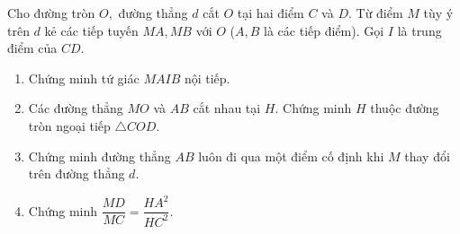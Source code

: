 \begin{bt}%
	Cho đường tròn $O,$ đường thẳng $d$ cắt $O$ tại hai điểm $C$ và $D.$ Từ điểm $M$ tùy ý trên $d$ kẻ các tiếp tuyến $MA,MB$ với $O$ ($A,B$ là các tiếp điểm). Gọi $I$ là trung điểm của $CD.$ 
	\begin{enumerate}
		\item Chứng minh tứ giác $MAIB$ nội tiếp.
		\item Các đường thẳng $MO$ và $AB$ cắt nhau tại $H.$ Chứng minh $H$ thuộc đường tròn ngoại tiếp $ \triangle COD$.
		\item Chứng minh đường thẳng $AB$ luôn đi qua một điểm cố định khi $M$ thay đổi trên đường thẳng $d.$
		\item Chứng minh $\dfrac{MD}{MC} =\dfrac{HA^2}{HC^2}$.
	\end{enumerate}
	

\end{bt}
